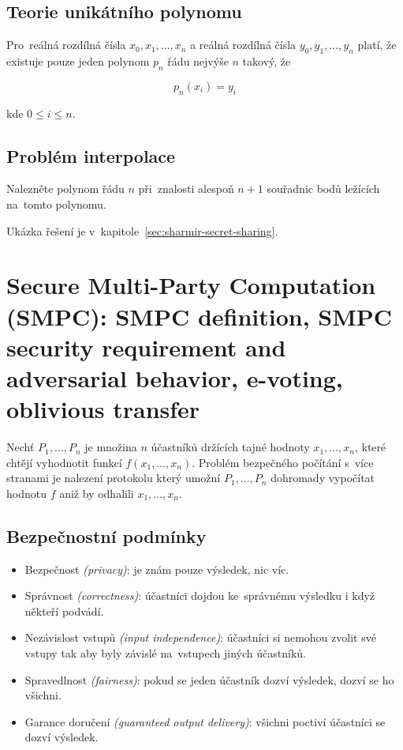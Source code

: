 \subsection{Teorie unikátního polynomu}

Pro~reálná rozdílná čísla $x_0, x_1, \dots, x_n$ a reálná rozdílná čísla $y_0, y_1, \dots, y_n$ platí, že existuje pouze jeden polynom $p_n$ řádu nejvýše $n$ takový, že

$$p_n(x_i) = y_i$$

\noindent
kde $0 \leq i \leq n$.

\subsection{Problém interpolace}


Nalezněte polynom řádu $n$ při~znalosti alespoň $n+1$ souřadnic bodů ležících na~tomto polynomu.

Ukázka řešení je v~kapitole~\ref{sec:sharmir-secret-sharing}.


\clearpage
\section{Secure Multi-Party Computation (SMPC): SMPC definition, SMPC security requirement and adversarial behavior, e-voting, oblivious transfer}

Nechť $P_1, \dots, P_n$ je množina $n$ účastníků držících tajné hodnoty $x_1, \dots, x_n$, které chtějí vyhodnotit funkcí $f(x_1, \dots, x_n)$.
Problém bezpečného počítání s~více stranami je nalezení protokolu který umožní $P_1, \dots, P_n$ dohromady vypočítat hodnotu $f$ aniž by odhalili $x_1, \dots, x_n$.


\subsection{Bezpečnostní podmínky}

\begin{itemize}
\item Bezpečnost \emph{(privacy)}: je znám pouze výsledek, nic víc.
\item Správnost \emph{(correctness)}: účastníci dojdou ke~správnému výsledku i když někteří podvádí.
\item Nezávislost vstupů \emph{(input independence)}: účastníci si nemohou zvolit své vstupy tak aby byly závislé na~vstupech jiných účastníků.
\item Spravedlnost \emph{(fairness)}: pokud se jeden účastník dozví výsledek, dozví se ho všichni.
\item Garance doručení \emph{(guaranteed output delivery)}: všichni poctiví účastníci se dozví výsledek.
\end{itemize}

